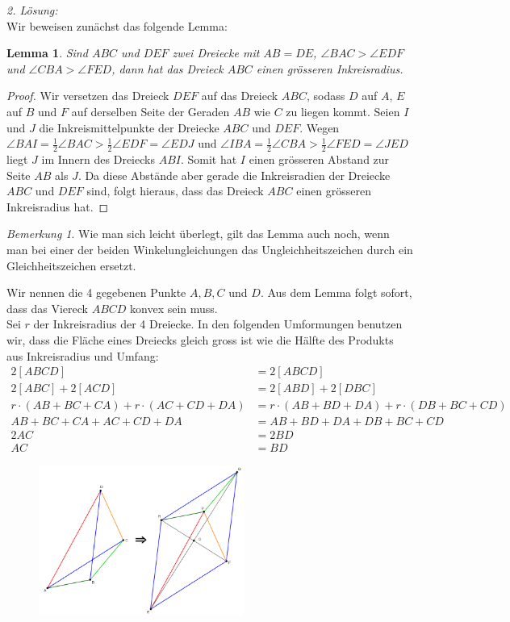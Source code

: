 \documentclass[12pt,a4paper]{article}
\theoremstyle{plain}
\newtheorem{lem*}{Lemma}
\theoremstyle{definition}
\theoremstyle{remark}
\newtheorem{rem}{Bemerkung}    %
\begin{document}
\begin{enumerate}
\textit{2. Lösung:}\\
Wir beweisen zunächst das folgende Lemma:

\begin{lem*}
Sind $ABC$ und $DEF$ zwei Dreiecke mit $AB=DE$, $\angle BAC>\angle EDF$ und $\angle CBA>\angle FED$, dann hat das Dreieck $ABC$ einen grösseren Inkreisradius.
\end{lem*}

\begin{proof}
Wir versetzen das Dreieck $DEF$ auf das Dreieck $ABC$, sodass $D$ auf $A$, $E$ auf $B$ und $F$ auf derselben Seite der Geraden $AB$ wie $C$ zu liegen kommt. Seien $I$ und $J$ die Inkreismittelpunkte der Dreiecke $ABC$ und $DEF$. Wegen $\angle BAI=\frac{1}{2}\angle BAC>\frac{1}{2}\angle EDF=\angle EDJ$ und $\angle IBA=\frac{1}{2}\angle CBA>\frac{1}{2}\angle FED=\angle JED$ liegt $J$ im Innern des Dreiecks $ABI$. Somit hat $I$ einen grösseren Abstand zur Seite $AB$ als $J$. Da diese Abstände aber gerade die Inkreisradien der Dreiecke $ABC$ und $DEF$ sind, folgt hieraus, dass das Dreieck $ABC$ einen grösseren Inkreisradius hat.
\end{proof}

\begin{rem}Wie man sich leicht überlegt, gilt das Lemma auch noch, wenn man bei einer der beiden Winkelungleichungen das Ungleichheitszeichen durch ein Gleichheitszeichen ersetzt.
\end{rem}

Wir nennen die 4 gegebenen Punkte $A,B,C$ und $D$. Aus dem Lemma folgt sofort, dass das Viereck $ABCD$ konvex sein muss.\\
Sei $r$ der Inkreisradius der 4 Dreiecke. In den folgenden Umformungen benutzen wir, dass die Fläche eines Dreiecks gleich gross ist wie die Hälfte des Produkts aus Inkreisradius und Umfang:
\begin{align*}
2[ABCD]&=2[ABCD]\\
2[ABC]+2[ACD]&=2[ABD]+2[DBC]\\
r\cdot(AB+BC+CA)+r\cdot(AC+CD+DA)&=r\cdot(AB+BD+DA)+r\cdot(DB+BC+CD)\\
AB+BC+CA+AC+CD+DA&=AB+BD+DA+DB+BC+CD\\
2AC&=2BD\\
AC&=BD
\end{align*}

\begin{figure}[htbp]
\centering \includegraphics[width=0.60\textwidth]{Inkreis} \label{fig:Aufgabe3}
\end{figure}


\end{enumerate}
\end{document}
